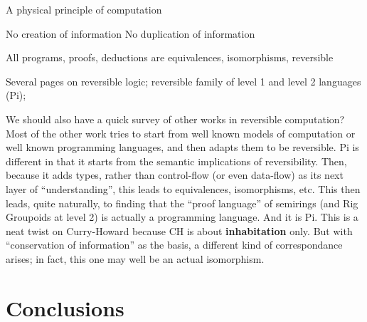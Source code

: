 \documentclass{article}
\begin{document}
A physical principle of computation

No creation of information
No duplication of information

All programs, proofs, deductions are equivalences, isomorphisms,
reversible

Several pages on reversible logic; reversible family of level 1 and
level 2 languages (Pi);

We should also have a quick survey of other works in reversible
computation? Most of the other work tries to start from well known
models of computation or well known programming languages, and then
adapts them to be reversible. Pi is different in that it starts from
the semantic implications of reversibility. Then, because it adds
types, rather than control-flow (or even data-flow) as its next layer
of ``understanding'', this leads to equivalences, isomorphisms, etc.
This then leads, quite naturally, to finding that the ``proof
language'' of semirings (and Rig Groupoids at level 2) is actually a
programming language. And it is Pi. This is a neat twist on
Curry-Howard because CH is about \textbf{inhabitation} only. But with
``conservation of information'' as the basis, a different kind of
correspondance arises; in fact, this one may well be an actual
isomorphism.

\section{Conclusions}



\end{document}

